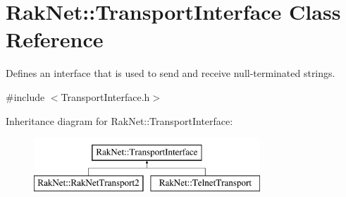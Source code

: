 \hypertarget{class_rak_net_1_1_transport_interface}{\section{Rak\-Net\-:\-:Transport\-Interface Class Reference}
\label{class_rak_net_1_1_transport_interface}
}


Defines an interface that is used to send and receive null-\/terminated strings.  




{\ttfamily \#include $<$Transport\-Interface.\-h$>$}

Inheritance diagram for Rak\-Net\-:\-:Transport\-Interface\-:\begin{figure}[H]
\begin{center}
\leavevmode
\includegraphics[height=2.000000cm]{class_rak_net_1_1_transport_interface}
\end{center}
\end{figure}

